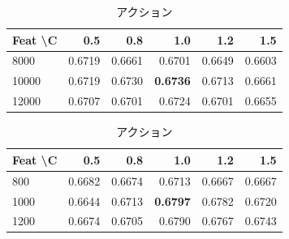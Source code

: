 \documentclass[uplatex, dvipdfmx, 11pt, a4paper, report]{jsbook}
\begin{document}
\begin{table}[H]
    \centering
    \small
    \begin{minipage}[t]{0.48\textwidth}
        \centering
        \caption{ホラー}
        \begin{tabular}{l|rrrrr}
            \hline
            Feat \textbackslash C & 0.5 & 0.8 & 1.0 & 1.2 & 1.5 \\ \hline
            8000 & 0.6719 & 0.6661 & 0.6701 & 0.6649 & 0.6603 \\
            10000 & 0.6719 & 0.6730 & \textbf{0.6736} & 0.6713 & 0.6661 \\
            12000 & 0.6707 & 0.6701 & 0.6724 & 0.6701 & 0.6655 \\ \hline
        \end{tabular}
    \end{minipage}
    \hfill
    \begin{minipage}[t]{0.48\textwidth}
        \centering
        \caption{アクション}
        \begin{tabular}{l|rrrrr}
            \hline
            Feat \textbackslash C & 0.5 & 0.8 & 1.0 & 1.2 & 1.5 \\ \hline
            800 & 0.6682 & 0.6674 & 0.6713 & 0.6667 & 0.6667 \\
            1000 & 0.6644 & 0.6713 & \textbf{0.6797} & 0.6782 & 0.6720 \\
            1200 & 0.6674 & 0.6705 & 0.6790 & 0.6767 & 0.6743 \\ \hline
        \end{tabular}
    \end{minipage}
\end{table}
\end{document}
